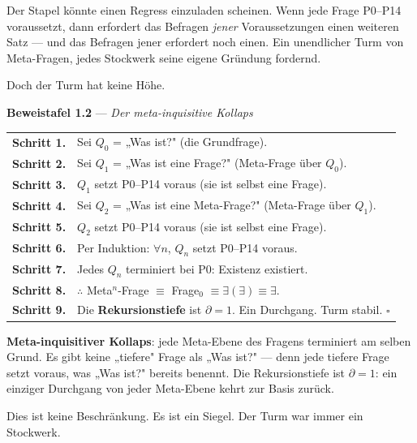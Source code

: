 \documentclass[10pt, openany, oneside]{book}
\begin{document}
Der Stapel könnte einen Regress einzuladen scheinen. Wenn jede Frage P0--P14 voraussetzt, dann erfordert das Befragen \textit{jener} Voraussetzungen einen weiteren Satz --- und das Befragen jener erfordert noch einen. Ein unendlicher Turm von Meta-Fragen, jedes Stockwerk seine eigene Gründung fordernd.

Doch der Turm hat keine Höhe.

\textbf{Beweistafel 1.2} --- \textit{Der meta-inquisitive Kollaps}

\vspace{0.5em}

\noindent\begin{tabular}{r p{}}
\textbf{Schritt 1.} & Sei $Q_0$ = „Was ist?" (die Grundfrage). \\[0.3em]
\textbf{Schritt 2.} & Sei $Q_1$ = „Was ist eine Frage?" (Meta-Frage über $Q_0$). \\[0.3em]
\textbf{Schritt 3.} & $Q_1$ setzt P0--P14 voraus (sie ist selbst eine Frage). \\[0.3em]
\textbf{Schritt 4.} & Sei $Q_2$ = „Was ist eine Meta-Frage?" (Meta-Frage über $Q_1$). \\[0.3em]
\textbf{Schritt 5.} & $Q_2$ setzt P0--P14 voraus (sie ist selbst eine Frage). \\[0.3em]
\textbf{Schritt 6.} & Per Induktion: $\forall n$, $Q_n$ setzt P0--P14 voraus. \\[0.3em]
\textbf{Schritt 7.} & Jedes $Q_n$ terminiert bei P0: Existenz existiert. \\[0.3em]
\textbf{Schritt 8.} & $\therefore$ Meta$^n$-Frage $\equiv$ Frage$_0$ $\equiv \exists(\exists) \equiv \exists$. \\[0.3em]
\textbf{Schritt 9.} & Die \textbf{Rekursionstiefe} ist $\partial = 1$. Ein Durchgang. Turm stabil. $\square$ \\[0.3em]
\end{tabular}

\vspace{0.8em}

\noindent \textbf{Meta-inquisitiver Kollaps}: jede Meta-Ebene des Fragens terminiert am selben Grund. Es gibt keine „tiefere" Frage als „Was ist?" --- denn jede tiefere Frage setzt voraus, was „Was ist?" bereits benennt. Die Rekursionstiefe ist $\partial = 1$: ein einziger Durchgang von jeder Meta-Ebene kehrt zur Basis zurück.

Dies ist keine Beschränkung. Es ist ein Siegel. Der Turm war immer ein Stockwerk.

\vspace{1.5em}
\end{document}
